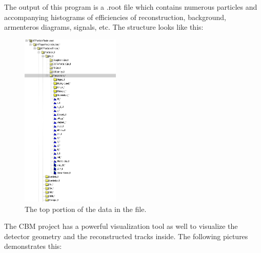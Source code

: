 \documentclass[a4paper,12pt]{article}
\begin{document}
\par The output of this program is a .root file which contains numerous particles and accompanying histograms of efficiencies
 of reconstruction, background, armenteros diagrams, signals, etc. The structure looks like this:
\begin{figure}[H]
	\centering
	\includegraphics[width=0.42\textwidth]{particle_file.png}
	\caption{ The top portion of the data in the file. }
\end{figure}
\vspace{5mm} 
\par  The CBM project has a powerful visualization tool as well to visualize the detector geometry and the reconstructed
 tracks inside. The following pictures demonstrates this:
\end{document}
